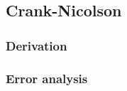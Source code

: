 \documentclass[12pt,english,a4paper]{article}
\begin{document}
%
\subsection{Crank-Nicolson}

\subsubsection{Derivation}

\subsubsection{Error analysis}




\clearpage
{}
\printbibliography
\end{document}
